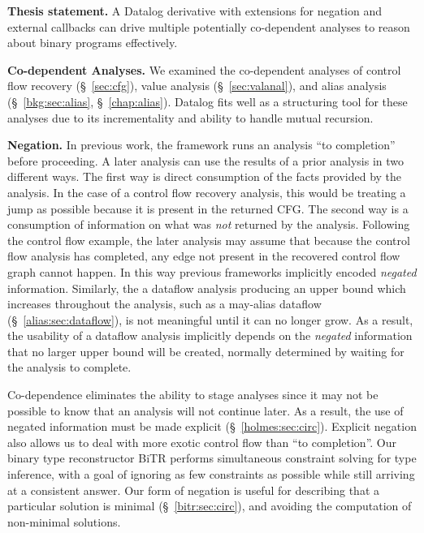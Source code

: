 \begin{inset}
{\bf Thesis statement.}
A Datalog derivative with extensions for negation and external callbacks can drive multiple potentially co-dependent analyses to reason about binary programs effectively.
\end{inset}

\noindent\textbf{Co-dependent Analyses.}
We examined the co-dependent analyses of control flow recovery (\S~\ref{sec:cfg}), value analysis (\S~\ref{sec:valanal}), and alias analysis (\S~\ref{bkg:sec:alias}, \S~\ref{chap:alias}).
Datalog fits well as a structuring tool for these analyses due to its incrementality and ability to handle mutual recursion.

\noindent\textbf{Negation.}
In previous work, the framework runs an analysis ``to completion'' before proceeding.
A later analysis can use the results of a prior analysis in two different ways.
The first way is direct consumption of the facts provided by the analysis.
In the case of a control flow recovery analysis, this would be treating a jump as possible because it is present in the returned CFG.
The second way is a consumption of information on what was \emph{not} returned by the analysis.
Following the control flow example, the later analysis may assume that because the control flow analysis has completed, any edge not present in the recovered control flow graph cannot happen.
In this way previous frameworks implicitly encoded \emph{negated} information.
Similarly, the a dataflow analysis producing an upper bound which increases throughout the analysis, such as a may-alias dataflow (\S~\ref{alias:sec:dataflow}), is not meaningful until it can no longer grow.
As a result, the usability of a dataflow analysis implicitly depends on the \emph{negated} information that no larger upper bound will be created, normally determined by waiting for the analysis to complete. 

Co-dependence eliminates the ability to stage analyses since it may not be possible to know that an analysis will not continue later.
As a result, the use of negated information must be made explicit (\S~\ref{holmes:sec:circ}).
Explicit negation also allows us to deal with more exotic control flow than ``to completion''.
Our binary type reconstructor {\sc BiTR} performs simultaneous constraint solving for type inference, with a goal of ignoring as few constraints as possible while still arriving at a consistent answer.
Our form of negation is useful for describing that a particular solution is minimal (\S~\ref{bitr:sec:circ}), and avoiding the computation of non-minimal solutions.

